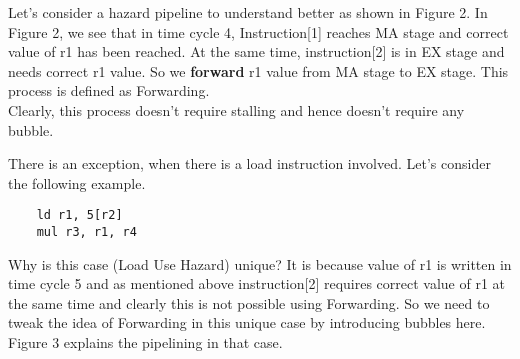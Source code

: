 \documentclass[12pt]{article}
\begin{document}
Let's consider a hazard pipeline to understand better as shown in Figure 2. In Figure 2, we see that in time cycle 4, Instruction[1] reaches MA stage and correct value of r1 has been reached. At the same time, instruction[2]  is in EX stage and needs correct r1 value. So we \textbf{forward} r1 value from MA stage to EX stage. This process is defined as Forwarding. \\

Clearly, this process doesn't require stalling and hence doesn't require any bubble. 

There is an exception, when there is a load instruction involved. Let's consider the following example.
\begin{verbatim}
    ld r1, 5[r2]
    mul r3, r1, r4
\end{verbatim}

Why is this case (Load Use Hazard) unique? It is because value of r1 is written in time cycle 5 and as mentioned above instruction[2] requires correct value of r1 at the same time and clearly this is not possible using Forwarding. So we need to tweak the idea of Forwarding in this unique case by introducing bubbles here. Figure 3 explains the pipelining in that case.
\end{document}
